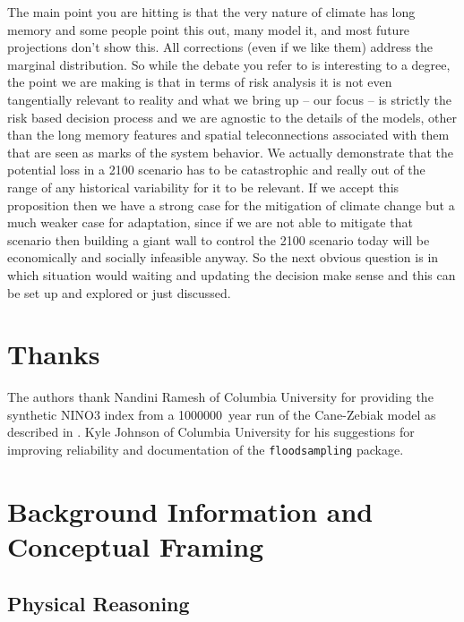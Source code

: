 \documentclass[12pt]{article}
\begin{document}
The main point you are hitting is that the very nature of climate has long memory and some people point this out, many model it, and most future projections don't show this.
All corrections (even if we like them) address the marginal distribution.
So while the debate you refer to is interesting to a degree, the point we are making is that in terms of risk analysis it is not even tangentially relevant to reality and what we bring up -- our focus -- is strictly the risk based decision process and we are agnostic to the details of the models, other than the long memory features and spatial teleconnections associated with them that are seen as marks of the system behavior.
We actually demonstrate that the potential loss in a 2100 scenario has to be catastrophic and really out of the range of any historical variability for it to be relevant.
If we accept this proposition then we have a strong case for the mitigation of climate change but a much weaker case for adaptation, since if we are not able to mitigate that scenario then building a giant wall to control the 2100 scenario today will be economically and socially infeasible anyway.
So the next obvious question is in which situation would waiting and updating the decision make sense and this can be set up and explored or just discussed.


\appendix
\printbibliography{}

\section{Thanks}

The authors thank Nandini Ramesh of Columbia University for providing the synthetic NINO3 index from a \SI{1000000}{year} run of the Cane-Zebiak model as described in \citet{Ramesh2017}.
Kyle Johnson of Columbia University for his suggestions for improving reliability and documentation of the \texttt{floodsampling} package.

\section{Background Information and Conceptual Framing}

\subsection{Physical Reasoning}
\end{document}
